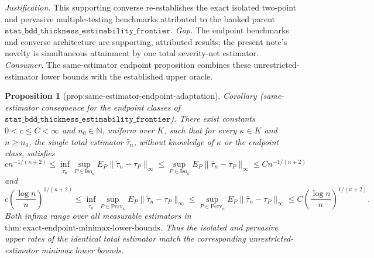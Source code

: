 \documentclass{article}
\newtheorem{proposition}{Proposition}
\begin{document}
\par\smallskip\noindent \textit{Justification.} This supporting converse re-establishes the exact isolated two-point and pervasive multiple-testing benchmarks attributed to the banked parent \(\texttt{stat\_bdd\_thickness\_estimability\_frontier}\). \textit{Gap.} The endpoint benchmarks and converse architecture are supporting, attributed results; the present note's novelty is simultaneous attainment by one total severity-net estimator. \textit{Consumer.} The same-estimator endpoint proposition combines these unrestricted-estimator lower bounds with the established upper oracle.

\begin{proposition}[prop:same-estimator-endpoint-adaptation]\label{prop:same-estimator-endpoint-adaptation}
Corollary (same-estimator consequence for the endpoint classes of
\(\texttt{stat\_bdd\_thickness\_estimability\_frontier}\)).  There exist constants \(0<c\leq C<\infty\) and \(n_0\in\mathbb N\), uniform over \(K\), such that for every \(\kappa\in K\) and \(n\geq n_0\), the single total estimator \(\widehat\tau_n\), without knowledge of \(\kappa\) or the endpoint class, satisfies
\[
 c n^{-1/(\kappa+2)}
 \leq
 \inf_{\widetilde\tau_n}\sup_{P\in\mathrm{Iso}_\kappa}
 E_P\|\widetilde\tau_n-\tau_P\|_\infty
 \leq
 \sup_{P\in\mathrm{Iso}_\kappa}
 E_P\|\widehat\tau_n-\tau_P\|_\infty
 \leq C n^{-1/(\kappa+2)}
\]
and
\[
 c\left(\frac{\log n}{n}\right)^{1/(\kappa+2)}
 \leq
 \inf_{\widetilde\tau_n}\sup_{P\in\mathrm{Perv}_\kappa}
 E_P\|\widetilde\tau_n-\tau_P\|_\infty
 \leq
 \sup_{P\in\mathrm{Perv}_\kappa}
 E_P\|\widehat\tau_n-\tau_P\|_\infty
 \leq C\left(\frac{\log n}{n}\right)^{1/(\kappa+2)}.
\]
Both infima range over all measurable estimators in
\(\mathrm{thm{:}exact\text{-}endpoint\text{-}minimax\text{-}lower\text{-}bounds}\).  Thus the isolated and pervasive upper rates of the identical total estimator match the corresponding unrestricted-estimator minimax lower bounds.
\end{proposition}
\end{document}
